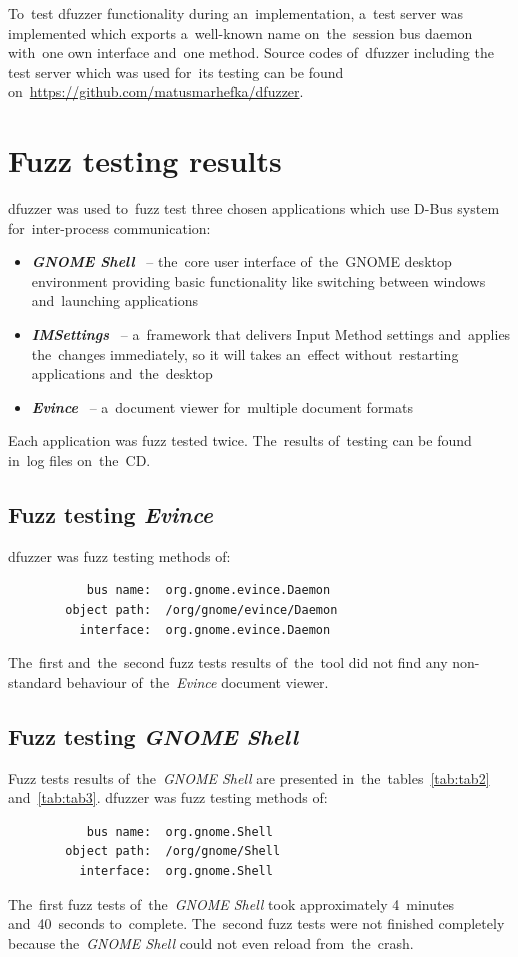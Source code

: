 To~test dfuzzer functionality during an~implementation, a~test server was
implemented which exports a~well-known name on~the~session bus daemon with~one own
interface and~one method. Source codes of~dfuzzer including the test server which
was used for~its testing can be found on~\url{https://github.com/matusmarhefka/dfuzzer}.



\chapter{Fuzz testing results}
dfuzzer was used to~fuzz test three chosen applications which use D-Bus system
for~inter-process communication:

\begin{itemize}
	\item \emph{\textbf{GNOME Shell}}~\cite{GNOMEShell} -- the~core user interface
		of~the~GNOME desktop environment providing basic functionality like
		switching between windows and~launching applications
	\item \emph{\textbf{IMSettings}}~\cite{IMSettings} -- a~framework that delivers
	Input Method settings and~applies the~changes immediately, so it will takes
	an~effect without~restarting applications and~the~desktop
	\item \emph{\textbf{Evince}}~\cite{GNOMEEvince} -- a~document viewer
		for~multiple document formats
\end{itemize}
Each application was fuzz tested twice. The~results of~testing can be found
in~log files on~the~CD.


\section{Fuzz testing \emph{Evince}}
dfuzzer was fuzz testing methods of:
\begin{verbatim}
           bus name:  org.gnome.evince.Daemon
        object path:  /org/gnome/evince/Daemon
          interface:  org.gnome.evince.Daemon
\end{verbatim}
The~first and~the~second fuzz tests results of~the~tool did not find any
non-standard behaviour of~the~\emph{Evince} document viewer.


\section{Fuzz testing \emph{GNOME Shell}}
Fuzz tests results of~the~\emph{GNOME Shell} are presented
in~the~tables~\ref{tab:tab2} and~\ref{tab:tab3}. dfuzzer was fuzz testing
methods of:
\begin{verbatim}
           bus name:  org.gnome.Shell
        object path:  /org/gnome/Shell
          interface:  org.gnome.Shell
\end{verbatim}
\newpage
The~first fuzz tests of~the~\emph{GNOME Shell} took approximately 4~minutes
and~40~seconds to~complete. The~second fuzz tests were not finished completely
because the~\emph{GNOME Shell} could not even reload from~the~crash.\\


